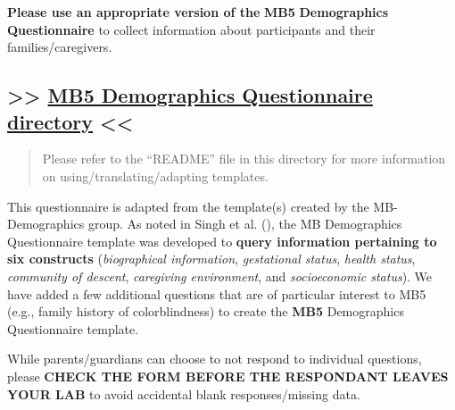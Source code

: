 \documentclass[
  letterpaper,
  DIV=11,
  numbers=noendperiod,
  oneside]{scrreprt}
\begin{document}
\textbf{Please use an appropriate version of the} \textbf{MB5}
\textbf{Demographics Questionnaire} to collect
information about participants and their families/caregivers.

\subsection{\texorpdfstring{\textgreater\textgreater{}
\href{https://drive.google.com/drive/folders/13ehUECKUy2BVtIlbTfMYIDbrVXxmSqR4?usp=drive_link}{MB5
Demographics Questionnaire directory}
\textless\textless{}}{\textgreater\textgreater{} MB5 Demographics Questionnaire directory \textless\textless{}}}\label{mb5-demographics-questionnaire-directory}

\begin{quote}
Please refer to the ``README'' file in this directory for more
information on using/translating/adapting templates.
\end{quote}

This questionnaire is adapted from the template(s) created by the
MB-Demographics group. As noted in Singh et al.
(), the MB Demographics Questionnaire
template was developed to \textbf{query information pertaining to six
constructs} (\emph{biographical information}, \emph{gestational status},
\emph{health status}, \emph{community of descent}, \emph{caregiving
environment}, and \emph{socioeconomic status}). We have added a few
additional questions that are of particular interest to MB5 (e.g.,
family history of colorblindness) to create the \textbf{MB5}
Demographics Questionnaire template.

\begin{tcolorbox}[enhanced jigsaw, coltitle=black, colframe=quarto-callout-warning-color-frame, titlerule=0mm, colback=white, arc=.35mm, toprule=.15mm, left=2mm, colbacktitle=quarto-callout-warning-color!10!white, opacityback=0, bottomtitle=1mm, title=\textcolor{quarto-callout-warning-color}{\faExclamationTriangle}\hspace{0.5em}{CHECK FOR MISSING DATA}, breakable, rightrule=.15mm, opacitybacktitle=0.6, toptitle=1mm, leftrule=.75mm, bottomrule=.15mm]

While parents/guardians can choose to not respond to individual
questions, please \textbf{CHECK THE FORM BEFORE THE RESPONDANT LEAVES
YOUR LAB} to avoid accidental blank responses/missing
data.\footnotemark{}

\end{tcolorbox}
\end{document}
